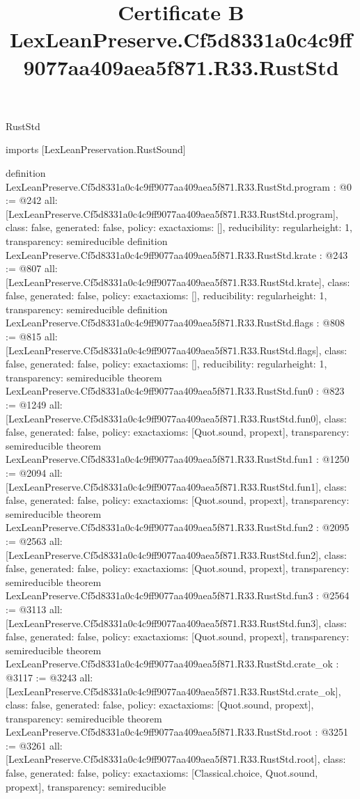 \begin{lexlean}{RustStd}
\title{Certificate B LexLeanPreserve.Cf5d8331a0c4c9ff9077aa409aea5f871.R33.RustStd}
\begin{coremodule}
imports [LexLeanPreservation.RustSound]

definition LexLeanPreserve.Cf5d8331a0c4c9ff9077aa409aea5f871.R33.RustStd.program : @0 := @242 {
  all: [LexLeanPreserve.Cf5d8331a0c4c9ff9077aa409aea5f871.R33.RustStd.program],
  class: false,
  generated: false,
  policy: exact{axioms: []},
  reducibility: regular{height: 1},
  transparency: semireducible
}
definition LexLeanPreserve.Cf5d8331a0c4c9ff9077aa409aea5f871.R33.RustStd.krate : @243 := @807 {
  all: [LexLeanPreserve.Cf5d8331a0c4c9ff9077aa409aea5f871.R33.RustStd.krate],
  class: false,
  generated: false,
  policy: exact{axioms: []},
  reducibility: regular{height: 1},
  transparency: semireducible
}
definition LexLeanPreserve.Cf5d8331a0c4c9ff9077aa409aea5f871.R33.RustStd.flags : @808 := @815 {
  all: [LexLeanPreserve.Cf5d8331a0c4c9ff9077aa409aea5f871.R33.RustStd.flags],
  class: false,
  generated: false,
  policy: exact{axioms: []},
  reducibility: regular{height: 1},
  transparency: semireducible
}
theorem LexLeanPreserve.Cf5d8331a0c4c9ff9077aa409aea5f871.R33.RustStd.fun0 : @823 := @1249 {
  all: [LexLeanPreserve.Cf5d8331a0c4c9ff9077aa409aea5f871.R33.RustStd.fun0],
  class: false,
  generated: false,
  policy: exact{axioms: [Quot.sound, propext]},
  transparency: semireducible
}
theorem LexLeanPreserve.Cf5d8331a0c4c9ff9077aa409aea5f871.R33.RustStd.fun1 : @1250 := @2094 {
  all: [LexLeanPreserve.Cf5d8331a0c4c9ff9077aa409aea5f871.R33.RustStd.fun1],
  class: false,
  generated: false,
  policy: exact{axioms: [Quot.sound, propext]},
  transparency: semireducible
}
theorem LexLeanPreserve.Cf5d8331a0c4c9ff9077aa409aea5f871.R33.RustStd.fun2 : @2095 := @2563 {
  all: [LexLeanPreserve.Cf5d8331a0c4c9ff9077aa409aea5f871.R33.RustStd.fun2],
  class: false,
  generated: false,
  policy: exact{axioms: [Quot.sound, propext]},
  transparency: semireducible
}
theorem LexLeanPreserve.Cf5d8331a0c4c9ff9077aa409aea5f871.R33.RustStd.fun3 : @2564 := @3113 {
  all: [LexLeanPreserve.Cf5d8331a0c4c9ff9077aa409aea5f871.R33.RustStd.fun3],
  class: false,
  generated: false,
  policy: exact{axioms: [Quot.sound, propext]},
  transparency: semireducible
}
theorem LexLeanPreserve.Cf5d8331a0c4c9ff9077aa409aea5f871.R33.RustStd.crate_ok : @3117 := @3243 {
  all: [LexLeanPreserve.Cf5d8331a0c4c9ff9077aa409aea5f871.R33.RustStd.crate_ok],
  class: false,
  generated: false,
  policy: exact{axioms: [Quot.sound, propext]},
  transparency: semireducible
}
theorem LexLeanPreserve.Cf5d8331a0c4c9ff9077aa409aea5f871.R33.RustStd.root : @3251 := @3261 {
  all: [LexLeanPreserve.Cf5d8331a0c4c9ff9077aa409aea5f871.R33.RustStd.root],
  class: false,
  generated: false,
  policy: exact{axioms: [Classical.choice, Quot.sound, propext]},
  transparency: semireducible
}


\end{coremodule}
\end{lexlean}
